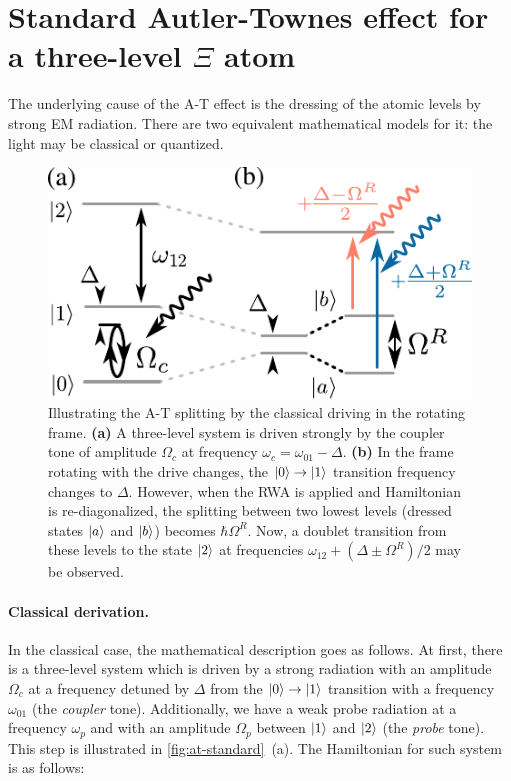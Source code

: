 \documentclass[%
 aps, prx,
 amsmath,amssymb,
 reprint,%
superscriptaddress
]{revtex4-2}
\begin{document}
\appendix

\section{Standard Autler-Townes effect for a three-level $\Xi$ atom} \label{sec:3-level-at}

The underlying cause of the A-T effect is the dressing of the atomic levels by strong EM radiation. There are two equivalent mathematical models for it: the light may be classical or quantized.

\begin{figure}[b]	
	\includegraphics[width=\linewidth]{intro_scheme}
	\caption{Illustrating the A-T splitting by  the classical driving in the rotating frame. \textbf{(a)} A three-level system is driven strongly by the coupler tone of amplitude $\Omega_c$ at frequency $\omega_c = \omega_{01}-\Delta$. \textbf{(b)} In the frame rotating with the drive changes, the $\ket{0}\rightarrow \ket{1}$ transition frequency changes to $\Delta$. However, when the RWA is applied and Hamiltonian is re-diagonalized, the splitting between two lowest levels (dressed states $\ket{a}$ and $\ket{b}$) becomes $\hbar \Omega^R$. Now, a doublet transition from these levels to the state $\ket{2}$ at frequencies $\omega_{12}+(\Delta \pm \Omega^R)/2$ may be observed.} 
	\label{fig:at-standard}
\end{figure}

\paragraph{Classical derivation.} In the classical case, the mathematical description goes as follows. At first, there is a three-level system which is driven by a strong radiation with an amplitude $\Omega_c$ at a frequency detuned by $\Delta$ from the $\ket{0}\rightarrow \ket{1}$ transition with a frequency $\omega_{01}$ (the \textit{coupler} tone). Additionally, we have a weak probe radiation at a frequency $\omega_{p}$ and with an amplitude $\Omega_p$ between $\ket{1}$ and $\ket{2}$ (the \textit{probe} tone). This step is illustrated in \autoref{fig:at-standard}~(a). The Hamiltonian for such system is as follows:
\end{document}
